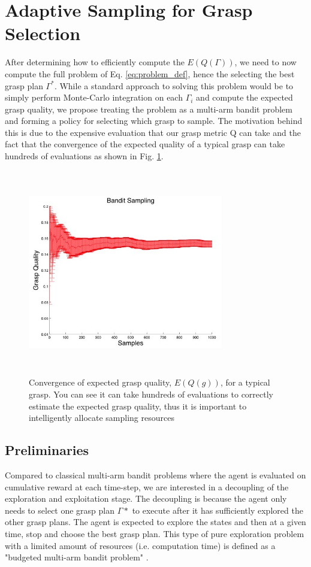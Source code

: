 \documentclass[letterpaper, 10 pt, conference]{ieeeconf}  %
\begin{document}
\section{Adaptive Sampling for Grasp Selection}
After determining how to efficiently compute the $E(Q(\Gamma))$, we need to now compute the full problem of Eq. \ref{eq:problem_def}, hence the selecting the best grasp plan $\Gamma^*$. While a standard approach to solving this problem would be to simply perform Monte-Carlo integration on each $\Gamma_i$ and compute the expected grasp quality, we propose treating the problem as a multi-arm bandit problem and forming a policy for selecting which grasp to sample. The motivation behind this is due to the expensive evaluation that our grasp metric Q can take \cite{ferrari1992} and the fact that the convergence of the expected quality of a typical grasp can take hundreds of evaluations as shown in Fig. \ref{fig:sampling_convergence}. 

\begin{figure}[ht!]
\centering
\includegraphics[width=8.5cm,height=9cm]{figures/Slide11.jpg}
\caption{ \footnotesize Convergence of expected grasp quality, $E(Q(g))$,  for a typical grasp. You can see it can take hundreds of evaluations to correctly estimate the expected grasp quality, thus it is important to  intelligently allocate sampling resources}
\vspace*{-10pt}
\label{fig:sampling_convergence}
\end{figure}


\subsection{Preliminaries}
Compared to classical multi-arm bandit problems where the agent is evaluated on cumulative reward at each time-step, we are interested in a decoupling of the exploration and exploitation stage. The decoupling is because the agent only needs to select one grasp plan $\Gamma*$ to execute after it has sufficiently explored the other grasp plans. The agent is expected to explore the states and then at a given time, stop and choose the best grasp plan. This type of pure exploration problem with a limited amount of resources (i.e. computation time) is defined as a "budgeted multi-arm bandit problem" \cite{madani2004budgeted}. 
\end{document}
